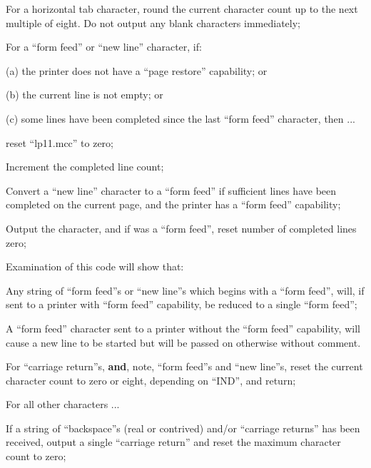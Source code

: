 \item[8917:] For a horizontal tab character, round the current character
count up to the next multiple of eight. Do not output
any blank characters immediately;

\item[8921:] For a ``form feed'' or ``new line'' character, if:

(a) the printer does not have a ``page
restore'' capability; or

(b) the current line is not empty; or

(c) some lines have been completed
since the last ``form feed'' character, then ...

\item[8925:] reset ``lp11.mcc'' to zero;

\item[8926:] Increment the completed line
count;

\item[8927:] Convert a ``new line'' character to
a ``form feed'' if sufficient lines
have been completed on the
current page, and the printer has
a ``form feed'' capability;

\item[8929:] Output the character, and if
was a ``form feed'', reset
number of completed lines
zero;
\ed

\noindent Examination of this code will show
that:

\bd
\item[(a)] Any string of ``form feed''s or
``new line''s which begins with a
``form feed'', will, if sent to a
printer with ``form feed'' capability, be reduced to a single
``form feed'';

\item[(b)] A ``form feed'' character sent to
a printer without the ``form
feed'' capability, will cause a
new line to be started but will
be passed on otherwise without
comment.
\ed

\bd
\item[8934:] For ``carriage return''s, {\bf and},
note, ``form feed''s and ``new
line''s, reset the current character count to zero or eight,
depending on ``IND'', and return;

\item[8949:] For all other characters ...

\item[8950:] If a string of ``backspace''s (real
or contrived) and/or ``carriage
returns'' has been received, output
a single ``carriage return''
and reset the maximum character
count to zero;


